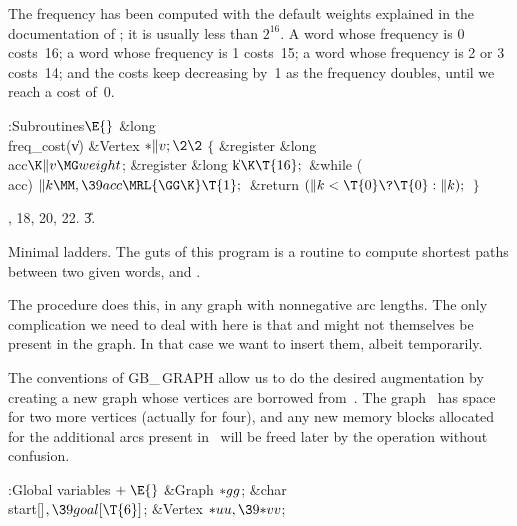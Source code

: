 The frequency has been computed with the default weights explained in the
documentation of ; it is usually less than $2^{16}$.
A word whose frequency is 0 costs~16; a word whose frequency is 1 costs~15;
a word whose frequency is 2 or 3 costs~14; and the costs keep decreasing
by~1 as the frequency doubles, until we reach a cost of~0.

\Y\B\4:Subroutines\X${}\E{}$\6
\1\1\&{long} \\{freq\_cost}(\|v)\6
\&{Vertex} ${}{*}\|v;\2\2{}$\6
${}\{{}$\5
\1\&{register} \&{long} \\{acc}${}\K\|v\MG\\{weight}{}$;\6
\&{register} \&{long} \|k${}\K\T{16};{}$\7
\&{while} (\\{acc})\1\5
${}\|k\MM,\39\\{acc}\MRL{{\GG}{\K}}\T{1};{}$\2\6
\&{return} ${}(\|k<\T{0}\?\T{0}:\|k);{}$\6
\4${}\}{}$\2\par
{}, 18, 20, 22.
\U3.\fi

Minimal ladders. The guts of this program is a routine to compute
shortest
paths between two given words,  and .

The  procedure does this, in any graph with nonnegative arc
lengths.
The only complication we need to deal with here is that  and 
might not themselves be present in the graph. In that case we want to insert
them, albeit temporarily.

The conventions of {\sc GB\_\,GRAPH} allow us to do the desired augmentation
by creating a new graph  whose vertices are borrowed from~.
The
graph~ has space for two more vertices (actually for four), and any
new memory blocks allocated for the additional arcs present in~ will
be freed later by the operation  without confusion.

\Y\B\4:Global variables\X${}\mathrel+\E{}$\6
\&{Graph} ${}{*}\\{gg}{}$;\6
\&{char} \\{start}[]${},\39\\{goal}[\T{6}]{}$;\6
\&{Vertex} ${}{*}\\{uu},\39{*}\\{vv}{}$;\par
\fi

